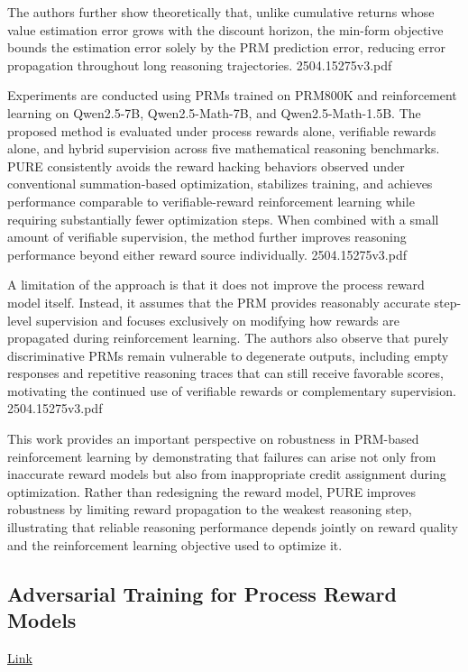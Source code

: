 \documentclass[11pt]{article}
\begin{document}
The authors further show theoretically that, unlike cumulative returns whose value estimation error grows with the discount horizon, the min-form objective bounds the estimation error solely by the PRM prediction error, reducing error propagation throughout long reasoning trajectories. 2504.15275v3.pdf

Experiments are conducted using PRMs trained on PRM800K and reinforcement learning on Qwen2.5-7B, Qwen2.5-Math-7B, and Qwen2.5-Math-1.5B. The proposed method is evaluated under process rewards alone, verifiable rewards alone, and hybrid supervision across five mathematical reasoning benchmarks. PURE consistently avoids the reward hacking behaviors observed under conventional summation-based optimization, stabilizes training, and achieves performance comparable to verifiable-reward reinforcement learning while requiring substantially fewer optimization steps. When combined with a small amount of verifiable supervision, the method further improves reasoning performance beyond either reward source individually. 2504.15275v3.pdf

A limitation of the approach is that it does not improve the process reward model itself. Instead, it assumes that the PRM provides reasonably accurate step-level supervision and focuses exclusively on modifying how rewards are propagated during reinforcement learning. The authors also observe that purely discriminative PRMs remain vulnerable to degenerate outputs, including empty responses and repetitive reasoning traces that can still receive favorable scores, motivating the continued use of verifiable rewards or complementary supervision. 2504.15275v3.pdf

This work provides an important perspective on robustness in PRM-based reinforcement learning by demonstrating that failures can arise not only from inaccurate reward models but also from inappropriate credit assignment during optimization. Rather than redesigning the reward model, PURE improves robustness by limiting reward propagation to the weakest reasoning step, illustrating that reliable reasoning performance depends jointly on reward quality and the reinforcement learning objective used to optimize it.

\subsection{Adversarial Training for Process Reward Models}

\href{https://arxiv.org/abs/2511.22888}{Link}
\end{document}
